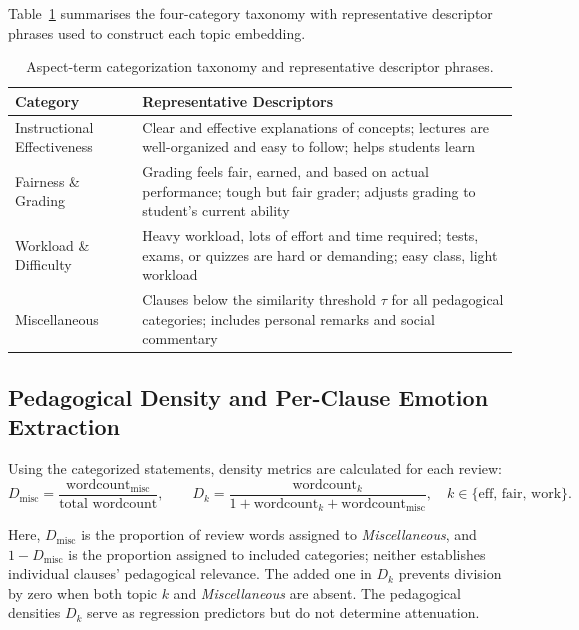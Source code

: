 \documentclass[fleqn,10pt]{JLA_article}
\begin{document}
Table~\ref{tab:atc-taxonomy} summarises the four-category taxonomy with representative descriptor phrases used to construct each topic embedding.

\begin{table}[htbp]
\caption{Aspect-term categorization taxonomy and representative descriptor phrases.}
\label{tab:atc-taxonomy}
\centering
\small
\begin{tabular}{p{3.8cm}p{8.2cm}}
\toprule
\textbf{Category} & \textbf{Representative Descriptors} \\
\midrule
Instructional Effectiveness & Clear and effective explanations of concepts; lectures are well-organized and easy to follow; helps students learn \\
\addlinespace
Fairness \& Grading & Grading feels fair, earned, and based on actual performance; tough but fair grader; adjusts grading to student's current ability \\
\addlinespace
Workload \& Difficulty & Heavy workload, lots of effort and time required; tests, exams, or quizzes are hard or demanding; easy class, light workload \\
\addlinespace
Miscellaneous & Clauses below the similarity threshold $\tau$ for all pedagogical categories; includes personal remarks and social commentary \\
\end{tabular}
\end{table}

\subsection{Pedagogical Density and Per-Clause Emotion Extraction}

Using the categorized statements, density metrics are calculated for each review:
\begin{equation}
D_{\text{misc}} =
\frac{\text{wordcount}_{\text{misc}}}
{\text{total wordcount}},
\qquad
D_{k} =
\frac{\text{wordcount}_{k}}
{1 + \text{wordcount}_{k} + \text{wordcount}_{\text{misc}}},
\quad k \in \{\text{eff},\,\text{fair},\,\text{work}\}.
\end{equation}

Here, $D_{\text{misc}}$ is the proportion of review words assigned to \textit{Miscellaneous}, and $1-D_{\text{misc}}$ is the proportion assigned to included categories; neither establishes individual clauses' pedagogical relevance. The added one in $D_k$ prevents division by zero when both topic $k$ and \textit{Miscellaneous} are absent. The pedagogical densities $D_k$ serve as regression predictors but do not determine attenuation.
\end{document}
